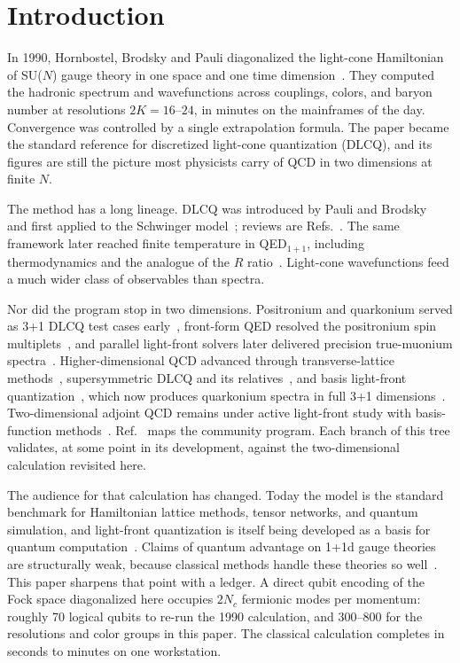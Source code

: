 \section{Introduction}
\label{sec:intro}

In 1990, Hornbostel, Brodsky and Pauli diagonalized the light-cone
Hamiltonian of SU($N$) gauge theory in one space and one time
dimension~\cite{Hornbostel:1988fb}.  They computed the hadronic spectrum and
wavefunctions across couplings, colors, and baryon number at resolutions
$2K = 16$--$24$, in minutes on the mainframes of the day.  Convergence was
controlled by a single extrapolation formula.  The paper became the standard
reference for discretized light-cone quantization (DLCQ), and its figures
are still the picture most physicists carry of QCD in two dimensions at
finite $N$.

The method has a long lineage.  DLCQ was introduced by Pauli and
Brodsky~\cite{Pauli:1985pv,Pauli:1985ps} and first applied to the Schwinger
model~\cite{Eller:1986nt}; reviews are
Refs.~\cite{Brodsky:1992mp,Brodsky:1997de}.  The same framework later
reached finite temperature in QED$_{1+1}$, including thermodynamics and the
analogue of the $R$ ratio~\cite{Strauss:2008zx,Strauss:2009zza}.  Light-cone
wavefunctions feed a much wider class of observables than spectra.

Nor did the program stop in two dimensions.  Positronium and quarkonium
served as 3+1 DLCQ test cases early~\cite{Krautgartner:1991xz}, front-form
QED resolved the positronium spin
multiplets~\cite{Trittmann:1997up,Trittmann:1997tt}, and parallel
light-front solvers later delivered precision true-muonium
spectra~\cite{Lamm:2013oga,Lamm:2016ong}.  Higher-dimensional QCD advanced
through transverse-lattice methods~\cite{Burkardt:2001jg}, supersymmetric
DLCQ and its relatives~\cite{Hiller:2016itl}, and basis light-front
quantization~\cite{Vary:2009gt}, which now produces quarkonium spectra in
full 3+1 dimensions~\cite{Li:2015zda}.  Two-dimensional adjoint QCD remains
under active light-front study with basis-function
methods~\cite{Trittmann:2023dar}.  Ref.~\cite{Bakker:2013cea} maps the
community program.  Each branch of this tree validates, at some point in its
development, against the two-dimensional calculation revisited here.

The audience for that calculation has changed.  Today the model is the
standard benchmark for Hamiltonian lattice methods, tensor networks, and
quantum simulation, and light-front quantization is itself being developed
as a basis for quantum
computation~\cite{Kreshchuk:2020dla,Kreshchuk:2020aiq,Li:2021kcs}.  Claims
of quantum advantage on 1+1d gauge theories are structurally weak, because
classical methods handle these theories so well~\cite{Lamm:2026vqz}.  This
paper sharpens that point with a ledger.  A direct qubit encoding of the
Fock space diagonalized here occupies $2N_c$ fermionic modes per momentum:
roughly 70 logical qubits to re-run the 1990 calculation, and 300--800 for
the resolutions and color groups in this paper.  The classical calculation
completes in seconds to minutes on one workstation.


